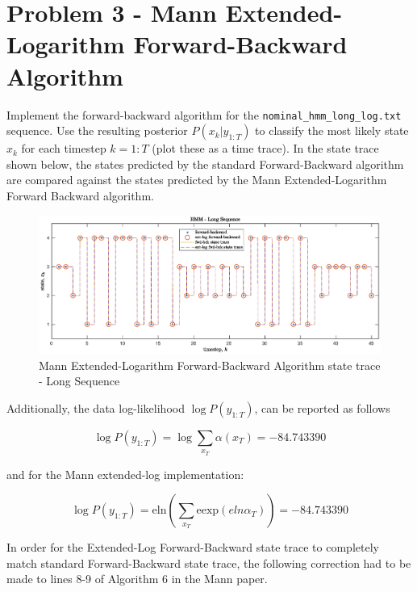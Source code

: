 \documentclass[]{article}
\begin{document}
\section*{Problem 3 - Mann Extended-Logarithm Forward-Backward Algorithm}

Implement the forward-backward algorithm for the \texttt{nominal\_hmm\_long\_log.txt} sequence. Use the resulting posterior $P(x_k \vert y_{1:T})$ to classify the most likely state $x_k$ for each timestep $k=1:T$ (plot these as a time trace). In the state trace shown below, the states predicted by the standard Forward-Backward algorithm are compared against the states predicted by the Mann Extended-Logarithm Forward Backward algorithm.

\begin{figure}[H]
	\begin{center}  
		\includegraphics[scale=0.53]{p3_state_trace_2.eps}  
		\caption{Mann Extended-Logarithm Forward-Backward Algorithm state trace - Long Sequence}
		\label{fig:short_fb}
	\end{center}  
\end{figure}

Additionally, the data log-likelihood $\log P(y_{1:T})$, can be reported as follows

\begin{equation}
	\log P(y_{1:T}) = \log \sum_{x_T} \alpha(x_T) = -84.743390
\end{equation}

and for the Mann extended-log implementation:

\begin{equation}
\log P(y_{1:T}) = \text{eln}\left( \sum_{x_T} \text{eexp}\left(eln\alpha_T\right) \right) = -84.743390
\end{equation}

\newpage

In order for the Extended-Log Forward-Backward state trace to completely match standard Forward-Backward state trace, the following correction had to be made to lines 8-9 of Algorithm 6 in the Mann paper.
\end{document}

